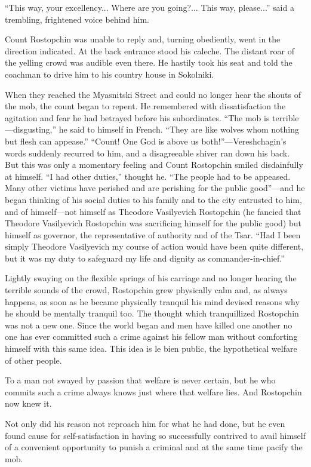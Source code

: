 ``This way, your excellency... Where are you going?... This way,
please...'' said a trembling, frightened voice behind him.

Count Rostopchin was unable to reply and, turning obediently,
went in the direction indicated. At the back entrance stood his
caleche. The distant roar of the yelling crowd was audible even
there. He hastily took his seat and told the coachman to drive
him to his country house in Sokolniki.

When they reached the Myasnitski Street and could no longer hear
the shouts of the mob, the count began to repent. He remembered
with dissatisfaction the agitation and fear he had betrayed
before his subordinates. ``The mob is terrible---disgusting,'' he
said to himself in French. ``They are like wolves whom nothing
but flesh can appease.''  ``Count! One God is above us
both!''---Vereshchagin's words suddenly recurred to him, and a
disagreeable shiver ran down his back. But this was only a
momentary feeling and Count Rostopchin smiled disdainfully at
himself. ``I had other duties,'' thought he. ``The people had to
be appeased. Many other victims have perished and are perishing
for the public good''---and he began thinking of his social
duties to his family and to the city entrusted to him, and of
himself---not himself as Theodore Vasilyevich Rostopchin (he
fancied that Theodore Vasilyevich Rostopchin was sacrificing
himself for the public good) but himself as governor, the
representative of authority and of the Tsar. ``Had I been simply
Theodore Vasilyevich my course of action would have been quite
different, but it was my duty to safeguard my life and dignity as
commander-in-chief.''

Lightly swaying on the flexible springs of his carriage and no
longer hearing the terrible sounds of the crowd, Rostopchin grew
physically calm and, as always happens, as soon as he became
physically tranquil his mind devised reasons why he should be
mentally tranquil too. The thought which tranquillized Rostopchin
was not a new one. Since the world began and men have killed one
another no one has ever committed such a crime against his fellow
man without comforting himself with this same idea. This idea is
le bien public, the hypothetical welfare of other people.

To a man not swayed by passion that welfare is never certain, but
he who commits such a crime always knows just where that welfare
lies. And Rostopchin now knew it.

Not only did his reason not reproach him for what he had done,
but he even found cause for self-satisfaction in having so
successfully contrived to avail himself of a convenient
opportunity to punish a criminal and at the same time pacify the
mob.

